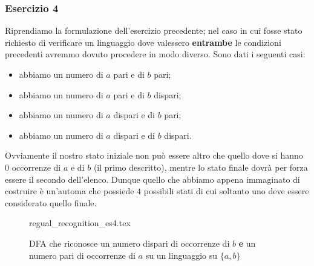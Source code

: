 \documentclass[class=book, crop=false, oneside, 12pt]{standalone}
\begin{document}
\subsubsection{Esercizio 4}
Riprendiamo la formulazione dell'esercizio precedente; nel caso in cui fosse stato richiesto di verificare un linguaggio dove valessero \textbf{entrambe} le condizioni precedenti avremmo dovuto procedere in modo diverso. Sono dati i seguenti casi:
\begin{itemize}
    \item abbiamo un numero di \(a\) pari e di \(b\) pari;
    \item abbiamo un numero di \(a\) pari e di \(b\) dispari;
    \item abbiamo un numero di \(a\) dispari e di \(b\) pari;
    \item abbiamo un numero di \(a\) dispari e di \(b\) dispari.
\end{itemize}
Ovviamente il nostro stato iniziale non può essere altro che quello dove si hanno \(0\) occorrenze di \(a\) e di \(b\) (il primo descritto), mentre lo stato finale dovrà per forza essere il secondo dell'elenco. Dunque quello che abbiamo appena immaginato di costruire è un'automa che possiede \(4\) possibili stati di cui soltanto uno deve essere considerato quello finale. 

\begin{figure}[H]
    \centering
    {regual_recognition_es4.tex}
    \caption{DFA che riconosce un numero dispari di occorrenze di \(b\) \textbf{e} un numero pari di occorrenze di \(a\) su un linguaggio su \(\{a,b\}\)}
    \label{dfa-b_odd-and-a_even}
\end{figure}
\end{document}
